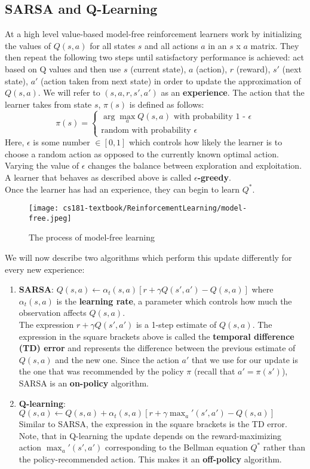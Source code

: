 \subsection{SARSA and Q-Learning}
At a high level value-based model-free reinforcement learners work by initializing the values of $Q(s, a)$ for all states $s$ and all actions $a$ in an $s$ x $a$ matrix. They then repeat the following two steps until satisfactory performance is achieved: act based on Q values and then use $s$ (current state), $a$ (action), $r$ (reward), $s'$ (next state), $a'$ (action taken from next state) in order to update the approximation of $Q(s, a)$. We will refer to $(s, a, r, s', a')$ as an \textbf{experience}. The action that the learner takes from state $s$, $\pi(s)$ is defined as follows:
\begin{equation}
    \pi(s) = 
    \begin{cases} 
      \arg\!\max_aQ(s, a) \text{ with probability 1 - }\epsilon \\
      \text{random with probability }\epsilon
    \end{cases}
\end{equation}
Here, $\epsilon$ is some number $\in [0, 1]$ which controls how likely the learner is to choose a random action as opposed to the currently known optimal action. Varying the value of $\epsilon$ changes the balance between exploration and exploitation. A learner that behaves as described above is called $\epsilon$\textbf{-greedy}.\\
Once the learner has had an experience, they can begin to learn $Q^*$. 
\begin{figure}[ht!]
    \centering
    \texttt{[image: cs181-textbook/ReinforcementLearning/model-free.jpeg]}
    \caption{The process of model-free learning}
\end{figure}
We will now describe two algorithms which perform this update differently for every new experience:
\begin{enumerate}
    \item \textbf{SARSA}: $Q(s, a) \leftarrow \alpha_t(s, a)[r + \gamma Q(s', a') - Q(s, a)]$ where $\alpha_t(s, a)$ is the \textbf{learning rate}, a parameter which controls how much the observation affects $Q(s, a)$.\\
    The expression $r + \gamma Q(s', a')$ is a 1-step estimate of $Q(s, a)$. The expression in the square brackets above is called the \textbf{temporal difference (TD) error} and represents the difference between the previous estimate of $Q(s, a)$ and the new one. Since the action $a'$ that we use for our update is the one that was recommended by the policy $\pi$ (recall that $a' = \pi(s')$), SARSA is an \textbf{on-policy} algorithm.
    \item \textbf{Q-learning}: $Q(s, a) \leftarrow Q(s, a) + \alpha_t(s, a)[r + \gamma\max_a'(s', a') - Q(s, a)]$\\
    Similar to SARSA, the expression in the square brackets is the TD error. Note, that in Q-learning the update depends on the reward-maximizing action $\max_a'(s', a')$ corresponding to the Bellman equation $Q^*$ rather than the policy-recommended action. This makes it an \textbf{off-policy} algorithm.
\end{enumerate}
